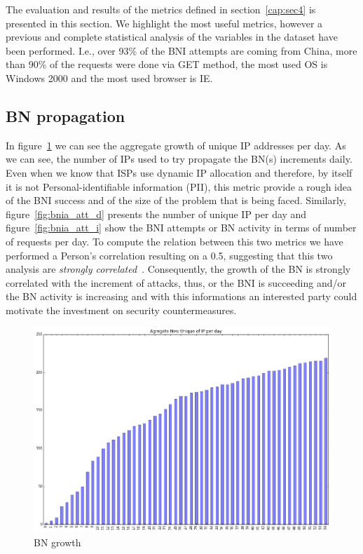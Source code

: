 
The evaluation and results of the metrics defined in section~\ref{cap:sec4} is presented in this section. We highlight the most useful metrics, however a previous and complete statistical analysis of the variables in the dataset have been performed. I.e., over 93\% of the BNI attempts are coming from China, more than 90\% of the requests were done via GET method, the most used OS is Windows 2000 and the most used browser is IE.

\subsection{BN propagation}
In figure~\ref{fig:agg_grow} we can see the aggregate growth of unique IP addresses per day. As we can see, the number of IPs used to try propagate the BN(s) increments daily. Even when we know that ISPs use dynamic IP allocation and therefore, by itself it is not Personal-identifiable information (PII), this metric provide a rough idea of the BNI success and of the size of the problem that is being faced.
Similarly, figure~\ref{fig:bnia_att_d} presents the number of unique IP per day and figure~\ref{fig:bnia_att_i} show the BNI attempts or BN activity in terms of number of requests per day. To compute the relation between this two metrics we have performed a Person's correlation resulting on a 0.5, suggesting that this two analysis are \textit{strongly correlated}~\cite{pear_corr}. Consequently, the growth of the BN is strongly correlated with the increment of attacks, thus, or the BNI is succeeding and/or the BN activity is increasing and with this informations an interested party could motivate the investment on security countermeasures.

\begin{figure}[h]
    \caption{BN growth}
    \label{fig:agg_grow}
    \centering
    \includegraphics[width=\linewidth]{images/a_new_ip_da}
\end{figure}


